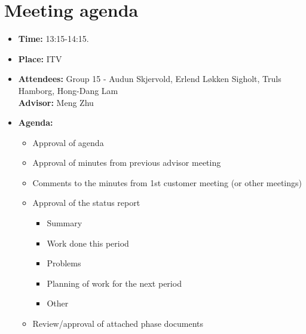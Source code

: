 \documentclass[12pt, a4paper]{article}
\begin{document}
\section{Meeting agenda }
\begin{itemize}
\item \textbf{Time:} 13:15-14:15.
\item \textbf{Place:} ITV\\
\item \textbf{Attendees:} Group 15 - Audun Skjervold, Erlend Løkken Sigholt, Truls Hamborg, Hong-Dang Lam \\ \textbf{Advisor:} Meng Zhu
\item \textbf{Agenda:} 
	\begin{itemize}
	\item Approval of agenda
	\item Approval of minutes from previous advisor meeting
	\item Comments to the minutes from 1st customer meeting (or other meetings)
	\item Approval of the status report
		\begin{itemize}
		\item Summary
		\item Work done this period
		\item Problems
		\item Planning of work for the next period
		\item Other
	\end{itemize}
	\item Review/approval of attached phase documents
	\end{itemize}
\end{itemize}
\end{document}
